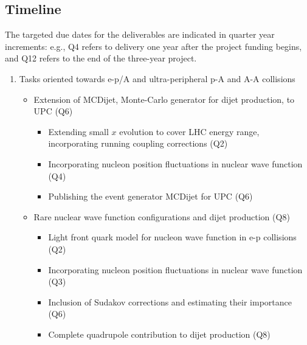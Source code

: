 		
		




    \vspace{0.5em}
    \subsection{Timeline}
        \label{sec:p12}
The targeted due dates for the deliverables are indicated in quarter year
increments: e.g., Q4 refers to delivery one year after the project funding
begins, and Q12 refers to the end of the three-year project.

        \begin{enumerate}
            \item Tasks oriented towards e-p/A and  
				ultra-peripheral p-A and A-A collisions   
                \begin{itemize}
                    \item Extension of MCDijet,  Monte-Carlo generator 
						for dijet production, to UPC (Q6)
                        \begin{itemize}
                            \item Extending small $x$ evolution to cover 
								LHC energy range, incorporating running
								coupling corrections  (Q2)
                            \item Incorporating nucleon position fluctuations 
								in nuclear wave function (Q4)
                            \item Publishing the event generator MCDijet for UPC  (Q6)
                        \end{itemize}
                    \item Rare nuclear wave function configurations 
						and dijet production 
						(Q8)
                        \begin{itemize}
							\item Light front quark model for 
							nucleon wave function in e-p collisions (Q2) 
                            \item Incorporating nucleon position fluctuations 
								in nuclear wave function   (Q3)
                            \item Inclusion of Sudakov corrections and
								estimating their importance  (Q6)
                            \item   
								Complete quadrupole contribution to dijet production  (Q8)
                        \end{itemize}
                \end{itemize}
        \end{enumerate}
